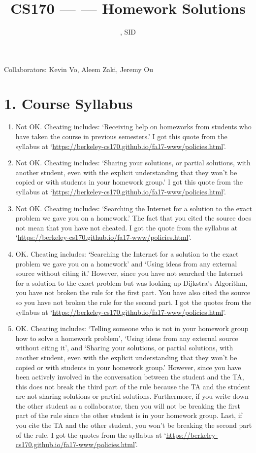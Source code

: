 \documentclass[11pt]{article}
\title{CS170 --- \Session --- Homework \Homework \space Solutions}
\author{\Name, SID \SID}
\date{}
\begin{document}
\maketitle

Collaborators: Kevin Vo, Aleem Zaki, Jeremy Ou

\section*{1. Course Syllabus}
\begin{enumerate}[label=(\alph*)]
\item
Not OK. Cheating includes: `Receiving help on homeworks from students who have taken the course in previous semesters.' I got this quote from the syllabus at `\url{https://berkeley-cs170.github.io/fa17-www/policies.html}'.

\item
Not OK. Cheating includes: `Sharing your solutions, or partial solutions, with another student, even with the explicit understanding that they won't be copied or with students in your homework group.' I got this quote from the syllabus at `\url{https://berkeley-cs170.github.io/fa17-www/policies.html}'.

\item
Not OK. Cheating includes: `Searching the Internet for a solution to the exact problem we gave you on a homework.' The fact that you cited the source does not mean that you have not cheated. I got the quote from the syllabus at `\url{https://berkeley-cs170.github.io/fa17-www/policies.html}'.

\item
OK. Cheating includes: `Searching the Internet for a solution to the exact problem we gave you on a homework' and `Using ideas from any external source without citing it.' However, since you have not searched the Internet for a solution to the exact problem but was looking up Dijkstra's Algorithm, you have not broken the rule for the first part. You have also cited the source so you have not broken the rule for the second part. I got the quotes from the syllabus at `\url{https://berkeley-cs170.github.io/fa17-www/policies.html}'.

\item
OK. Cheating includes: `Telling someone who is not in your homework group how to solve a homework problem', `Using ideas from any external source without citing it', and `Sharing your solutions, or partial solutions, with another student, even with the explicit understanding that they won't be copied or with students in your homework group.' However, since you have been actively involved in the conversation between the student and the TA, this does not break the third part of the rule because the TA and the student are not sharing solutions or partial solutions. Furthermore, if you write down the other student as a collaborator, then you will not be breaking the first part of the rule since the other student is in your homework group. Last, if you cite the TA and the other student, you won't be breaking the second part of the rule. I got the quotes from the syllabus at `\url{https://berkeley-cs170.github.io/fa17-www/policies.html}'.

\end{enumerate}
\end{document}
